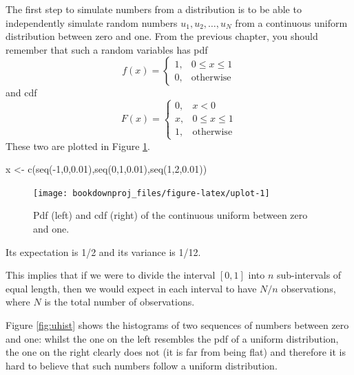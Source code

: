 \documentclass[
]{book}
\newenvironment{Shaded}{\begin{snugshade}}{\end{snugshade}}
\newcommand{\DecValTok}[1]{\textcolor[rgb]{0.00,0.00,0.81}{#1}}
\newcommand{\FloatTok}[1]{\textcolor[rgb]{0.00,0.00,0.81}{#1}}
\newcommand{\FunctionTok}[1]{\textcolor[rgb]{0.00,0.00,0.00}{#1}}
\newcommand{\NormalTok}[1]{#1}
\newcommand{\OtherTok}[1]{\textcolor[rgb]{0.56,0.35,0.01}{#1}}
\newcommand{\SpecialCharTok}[1]{\textcolor[rgb]{0.00,0.00,0.00}{#1}}
\theoremstyle{definition}
\theoremstyle{definition}
\theoremstyle{definition}
\theoremstyle{definition}
\theoremstyle{remark}
\begin{document}
The first step to simulate numbers from a distribution is to be able to independently simulate random numbers \(u_1,u_2,\dots,u_N\) from a continuous uniform distribution between zero and one. From the previous chapter, you should remember that such a random variables has pdf
\[
f(x)=\left\{
\begin{array}{ll}
1, & 0\leq x \leq 1\\
0, &\mbox{otherwise}
\end{array}
\right.
\]
and cdf
\[
F(x)=\left\{
\begin{array}{ll}
0, & x<0\\
x, & 0\leq x \leq 1\\
1, &\mbox{otherwise}
\end{array}
\right.
\]
These two are plotted in Figure \ref{fig:uplot}.

\begin{Shaded}
\begin{Highlighting}[]
\NormalTok{x }\OtherTok{\textless{}{-}} \FunctionTok{c}\NormalTok{(}\FunctionTok{seq}\NormalTok{(}\SpecialCharTok{{-}}\DecValTok{1}\NormalTok{,}\DecValTok{0}\NormalTok{,}\FloatTok{0.01}\NormalTok{),}\FunctionTok{seq}\NormalTok{(}\DecValTok{0}\NormalTok{,}\DecValTok{1}\NormalTok{,}\FloatTok{0.01}\NormalTok{),}\FunctionTok{seq}\NormalTok{(}\DecValTok{1}\NormalTok{,}\DecValTok{2}\NormalTok{,}\FloatTok{0.01}\NormalTok{))}
\end{Highlighting}
\end{Shaded}

\begin{figure}

{\centering \texttt{[image: bookdownproj\_files/figure-latex/uplot-1]} 

}

\caption{Pdf (left) and cdf (right) of the continuous uniform between zero and one.}\label{fig:uplot}
\end{figure}

Its expectation is 1/2 and its variance is 1/12.

This implies that if we were to divide the interval \([0,1]\) into \(n\) sub-intervals of equal length, then we would expect in each interval to have \(N/n\) observations, where \(N\) is the total number of observations.

Figure \ref{fig:uhist} shows the histograms of two sequences of numbers between zero and one: whilst the one on the left resembles the pdf of a uniform distribution, the one on the right clearly does not (it is far from being flat) and therefore it is hard to believe that such numbers follow a uniform distribution.
\end{document}
